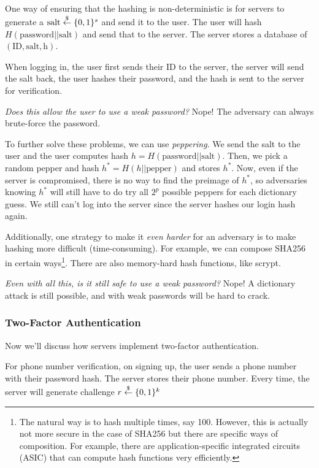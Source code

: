 
One way of ensuring that the hashing is non-deterministic is for servers to generate a $\mathrm{salt}\overset{\$}{\leftarrow}\{0, 1\}^s$ and send it to the user. The user will hash $H(\mathrm{password}||\mathrm{salt})$ and send that to the server. The server stores a database of $(\mathrm{ID}, \mathrm{salt}, \mathrm{h})$.

When logging in, the user first sends their ID to the server, the server will send the salt back, the user hashes their password, and the hash is sent to the server for verification.

\emph{Does this allow the user to use a weak password?} Nope! The adversary can always brute-force the password.

To further solve these problems, we can use \emph{peppering}. We send the salt to the user and the user computes hash $h = H(\mathrm{password}||\mathrm{salt})$. Then, we pick a random pepper and hash $h^* = H(h||\mathrm{pepper})$ and stores $h^*$. Now, even if the server is compromised, there is no way to find the preimage of $h^*$, so adversaries knowing $h^*$ will still have to do try all $2^p$ possible peppers for each dictionary guess. We still can't log into the server since the server hashes our login hash again.

Additionally, one strategy to make it \emph{even harder} for an adversary is to make hashing more difficult (time-consuming). For example, we can compose SHA256 in certain ways\footnote{The natural way is to hash multiple times, say 100. However, this is actually not more secure in the case of SHA256 but there are specific ways of composition. For example, there are application-specific integrated circuits (ASIC) that can compute hash functions very efficiently.}. There are also memory-hard hash functions, like scrypt.

\emph{Even with all this, is it still safe to use a weak password?} Nope! A dictionary attack is still possible, and with weak passwords will be hard to crack.

\subsubsection{Two-Factor Authentication}
Now we'll discuss how servers implement two-factor authentication.

For phone number verification, on signing up, the user sends a phone number with their password hash. The server stores their phone number. Every time, the server will generate challenge $r\overset{\$}{\leftarrow}\{0,1\}^k$

